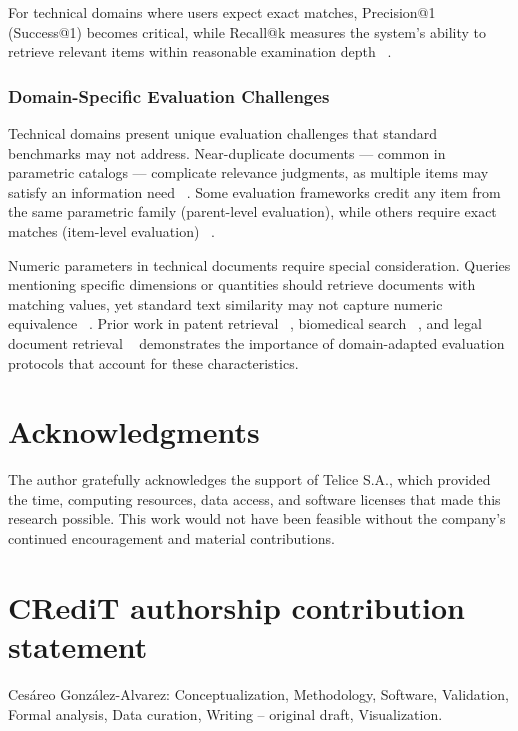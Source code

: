 \documentclass[preprint,12pt]{elsarticle}
\begin{document}
For technical domains where users expect exact matches, Precision@1 (Success@1) becomes critical, while Recall@k measures the system's ability to retrieve relevant items within reasonable examination depth ~\cite{baeza-yates_riberio-neto_1999}.

\subsubsection{Domain-Specific Evaluation Challenges}

Technical domains present unique evaluation challenges that standard benchmarks may not address. Near-duplicate documents --- common in parametric catalogs --- complicate relevance judgments, as multiple items may satisfy an information need ~\cite{bernstein2005redundant}. Some evaluation frameworks credit any item from the same parametric family (parent-level evaluation), while others require exact matches (item-level evaluation) ~\cite{piroi2011clef}.

Numeric parameters in technical documents require special consideration. Queries mentioning specific dimensions or quantities should retrieve documents with matching values, yet standard text similarity may not capture numeric equivalence ~\cite{sarawagi2004efficient}. Prior work in patent retrieval ~\cite{piroi2011clef}, biomedical search ~\cite{simpson2014}, and legal document retrieval ~\cite{locke2017automatic} demonstrates the importance of domain-adapted evaluation protocols that account for these characteristics.

\section*{Acknowledgments}

The author gratefully acknowledges the support of Telice S.A., which provided the time, computing resources, data access, and software licenses that made this research possible. This work would not have been feasible without the company’s continued encouragement and material contributions.

\section*{CRediT authorship contribution statement} %

Cesáreo González-Alvarez: Conceptualization, Methodology, Software, Validation, Formal analysis, Data curation, Writing – original draft, Visualization.
\end{document}
